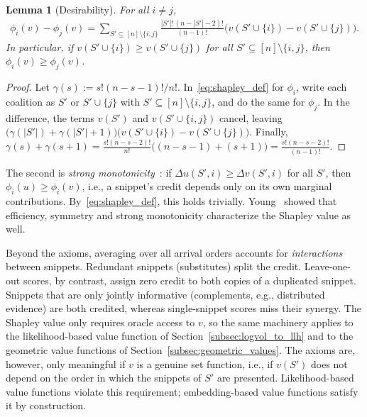 \documentclass{article}
\newtheorem{lemma}[theorem]{Lemma}
\begin{document}
\begin{lemma}[Desirability]\label{lem:desirability}
For all $i \neq j$,
\begin{align}
    \phi_i(v) - \phi_j(v) = \sum_{S' \subseteq [n] \setminus \{i,j\}} \frac{|S'|!\,(n - |S'| - 2)!}{(n-1)!} \big( v(S' \cup \{i\}) - v(S' \cup \{j\}) \big).
\end{align}
In particular, if $v(S' \cup \{i\}) \ge v(S' \cup \{j\})$ for all $S' \subseteq [n] \setminus \{i,j\}$, then $\phi_i(v) \ge \phi_j(v)$.
\end{lemma}

\begin{proof}
Let $\gamma(s) := s!(n-s-1)!/n!$. In~\eqref{eq:shapley_def} for $\phi_i$, write each coalition as $S'$ or $S' \cup \{j\}$ with $S' \subseteq [n] \setminus \{i,j\}$, and do the same for $\phi_j$. In the difference, the terms $v(S')$ and $v(S' \cup \{i,j\})$ cancel, leaving $\big(\gamma(|S'|) + \gamma(|S'|+1)\big)\big(v(S' \cup \{i\}) - v(S' \cup \{j\})\big)$. Finally, $\gamma(s) + \gamma(s+1) = \frac{s!(n-s-2)!}{n!}\big((n-s-1) + (s+1)\big) = \frac{s!(n-s-2)!}{(n-1)!}$.
\end{proof}

The second is \emph{strong monotonicity}~\cite{young1985monotonic}: if $\Delta u(S', i) \ge \Delta v(S', i)$ for all $S'$, then $\phi_i(u) \ge \phi_i(v)$, i.e., a snippet's credit depends only on its own marginal contributions. By~\eqref{eq:shapley_def}, this holds trivially. Young~\cite{young1985monotonic} showed that efficiency, symmetry and strong monotonicity characterize the Shapley value as well.

Beyond the axioms, averaging over all arrival orders accounts for \emph{interactions} between snippets. Redundant snippets (substitutes) split the credit. Leave-one-out scores, by contrast, assign zero credit to both copies of a duplicated snippet. Snippets that are only jointly informative (complements, e.g., distributed evidence) are both credited, whereas single-snippet scores miss their synergy. The Shapley value only requires oracle access to $v$, so the same machinery applies to the likelihood-based value function of Section~\ref{subsec:logvol_to_llh} and to the geometric value functions of Section~\ref{subsec:geometric_values}. The axioms are, however, only meaningful if $v$ is a genuine set function, i.e., if $v(S')$ does not depend on the order in which the snippets of $S'$ are presented. Likelihood-based value functions violate this requirement; embedding-based value functions satisfy it by construction.
\end{document}
